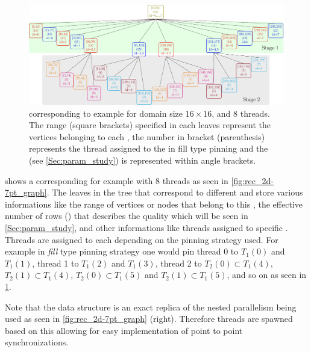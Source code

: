 	 \begin{figure}[thbp]
		 \includegraphics[width=\textwidth, height=0.2\textheight]{pics/recursion/2d-7pt_example/tree/tree}
	 	\caption{\levelTree corresponding to \STEX example for domain size $16 \times 16$, and 8 threads. The range (square brackets) specified in each leaves represent the vertices belonging to each \levelGroup, the number in bracket (parenthesis) represents the thread assigned to the \levelGroup in fill type pinning and the \nrowsEff (see \cref{Sec:param_study}) is represented within angle brackets.}
	 	\label{fig:rec_2d-7pt_tree}
	 \end{figure}

 
  shows a \levelTree corresponding for \STEX example with 8 threads as seen in \cref{fig:rec_2d-7pt_graph}. The leaves in the tree that correspond to different \levelGroups and store various informations like the range of vertices or nodes that belong to this \levelGroup, the effective number of rows (\nrowsEff) that describes the quality which will be seen in \cref{Sec:param_study}, and other informations like threads assigned to specific \levelGroups.  Threads are assigned to each \levelGroup depending on the pinning strategy used. For example in \emph{fill} type pinning strategy one would pin thread 0 to $T_1(0)$ and $T_1(1)$, thread 1 to $T_1(2)$ and $T_1(3)$, thread 2 to $T_2(0)  \subset T_1(4)$, $T_2(1) \subset T_1(4)$, $T_2(0)  \subset T_1(5)$ and $T_2(1) \subset T_1(5)$, and so on as seen in \cref{fig:rec_2d-7pt_tree}. 
 
 Note that the \levelTree data structure is an exact replica of the nested parallelism being used as seen in \cref{fig:rec_2d-7pt_graph} (right). Therefore threads are spawned based on this \levelTree allowing for easy implementation of point to point synchronizations.

